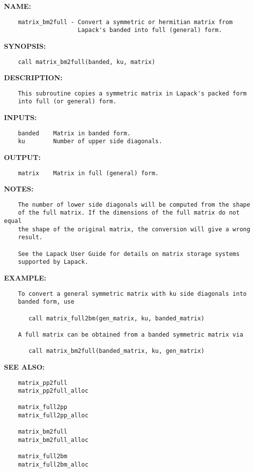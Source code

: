 \label{ch:robo16}
\label{ch:Matrices_matrix_bm2full}
\textbf{NAME:}\hspace{0.08in}\begin{Verbatim}
    matrix_bm2full - Convert a symmetric or hermitian matrix from
                     Lapack's banded into full (general) form.
\end{Verbatim}
\textbf{SYNOPSIS:}\hspace{0.08in}\begin{Verbatim}
    call matrix_bm2full(banded, ku, matrix)
\end{Verbatim}
\textbf{DESCRIPTION:}\hspace{0.08in}\begin{Verbatim}
    This subroutine copies a symmetric matrix in Lapack's packed form
    into full (or general) form.
\end{Verbatim}
\textbf{INPUTS:}\hspace{0.08in}\begin{Verbatim}
    banded    Matrix in banded form.
    ku        Number of upper side diagonals.
\end{Verbatim}
\textbf{OUTPUT:}\hspace{0.08in}\begin{Verbatim}
    matrix    Matrix in full (general) form.
\end{Verbatim}
\textbf{NOTES:}\hspace{0.08in}\begin{Verbatim}
    The number of lower side diagonals will be computed from the shape
    of the full matrix. If the dimensions of the full matrix do not equal
    the shape of the original matrix, the conversion will give a wrong
    result.

    See the Lapack User Guide for details on matrix storage systems 
    supported by Lapack. 
\end{Verbatim}
\textbf{EXAMPLE:}\hspace{0.08in}\begin{Verbatim}
    To convert a general symmetric matrix with ku side diagonals into 
    banded form, use

       call matrix_full2bm(gen_matrix, ku, banded_matrix)

    A full matrix can be obtained from a banded symmetric matrix via

       call matrix_bm2full(banded_matrix, ku, gen_matrix)
\end{Verbatim}
\textbf{SEE ALSO:}\hspace{0.08in}\begin{Verbatim}
    matrix_pp2full
    matrix_pp2full_alloc

    matrix_full2pp
    matrix_full2pp_alloc

    matrix_bm2full
    matrix_bm2full_alloc

    matrix_full2bm
    matrix_full2bm_alloc
\end{Verbatim}
